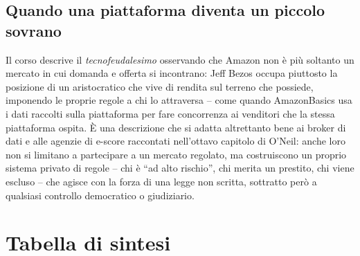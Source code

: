 \documentclass[a4paper,11pt]{article}
\begin{document}
\subsection{Quando una piattaforma diventa un piccolo sovrano}

Il corso descrive il \emph{tecnofeudalesimo} osservando che Amazon non è più soltanto un mercato in cui domanda e offerta si incontrano: Jeff Bezos occupa piuttosto la posizione di un aristocratico che vive di rendita sul terreno che possiede, imponendo le proprie regole a chi lo attraversa -- come quando AmazonBasics usa i dati raccolti sulla piattaforma per fare concorrenza ai venditori che la stessa piattaforma ospita. È una descrizione che si adatta altrettanto bene ai broker di dati e alle agenzie di e-score raccontati nell'ottavo capitolo di O'Neil: anche loro non si limitano a partecipare a un mercato regolato, ma costruiscono un proprio sistema privato di regole -- chi è ``ad alto rischio'', chi merita un prestito, chi viene escluso -- che agisce con la forza di una legge non scritta, sottratto però a qualsiasi controllo democratico o giudiziario.

\section{Tabella di sintesi}
\end{document}
